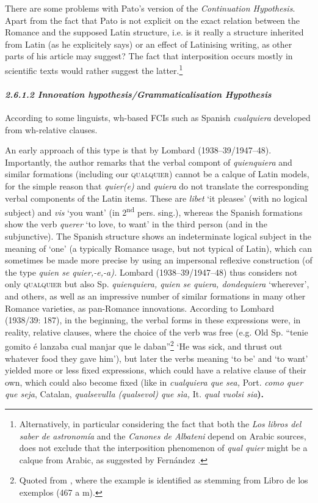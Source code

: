   There are some problems with Pato’s version of the \textit{Continuation Hypothesis}. Apart from the fact that Pato is not explicit on the exact relation between the Romance and the supposed Latin structure, i.e. is it really a structure inherited from Latin (as he explicitely says) or an effect of Latinising writing, as other parts of his article may suggest? The fact that interposition occurs mostly in scientific texts would rather suggest the latter.\footnote{Alternatively, in particular considering the fact that both the {\textit{Los libros del saber de astronomía}} {and the} {\textit{Canones de Albateni}} {depend on Arabic sources, \citet[306]{Pato2012} does not exclude that the interposition phenomenon of} {\textit{qual quier}} {might be a calque from Arabic, as suggested by Fernández \citet{González1992}.}}

\paragraph{\textit{2.6.1.2 Innovation hypothesis/Grammaticalisation Hypothesis}}

  According to some linguists, wh-based FCIs such as Spanish \textit{cualquiera} developed from wh-relative clauses. 

  An early approach of this type is that by Lombard (1938–39/1947–48). Importantly, the author remarks that the verbal compont of \textit{quienquiera} and similar formations (including our \textsc{qualquier}) cannot be a calque of Latin models, for the simple reason that \textit{quier(e)} and \textit{quiera} do not translate the corresponding verbal components of the Latin items. These are \textit{libet} ‘it pleases’ (with no logical subject) and \textit{vis} ‘you want’ (in 2\textsuperscript{nd} pers. sing.), whereas the Spanish formations show the verb \textit{querer} ‘to love, to want’ in the third person (and in the subjunctive). The Spanish structure shows an indeterminate logical subject in the meaning of ‘one’ (a typically Romance usage, but not typical of Latin), which can sometimes be made more precise by using an impersonal reflexive construction (of the type \textit{quien se quier,\nobreakdash-e,\nobreakdash-a).} Lombard (1938–39/1947–48) thus considers not only \textsc{qualquier} but also Sp. \textit{quienquiera, quien se quiera, dondequiera} ‘wherever’, and others, as well as an impressive number of similar formations in many other Romance varieties, as pan-Romance innovations. According to Lombard (1938/39: 187), in the beginning, the verbal forms in these expressions were, in reality, relative clauses, where the choice of the verb was free (e.g. Old Sp. “tenie gomito é lanzaba cual manjar que le daban”\footnote{Quoted from \citet[159]{Gessner1895}, where the example is identified as stemming from Libro de los exemplos (467 a m).} ‘He was sick, and thrust out whatever food they gave him’), but later the verbs meaning ‘to be’ and ‘to want’ yielded more or less fixed expressions, which could have a relative clause of their own, which could also become fixed (like in \textit{cualquiera que sea,} Port. \textit{como quer que seja}, Catalan, \textit{qualsevulla (qualsevol) que sìa,} It. \textit{qual vuolsi sia}\textbf{).}

